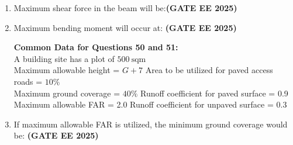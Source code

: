 \documentclass[journal,12pt,onecolumn]{IEEEtran}
\theoremstyle{remark}
\begin{document}
{\begin{enumerate}
\textbf{Common Data for Questions 48 and 49:} 
A beam of span $L$ is simply supported at two ends. One half span of the beam weighs $W$ and the remaining half span weighs $2W$.

\item Maximum shear force in the beam will be:\hfill \textbf{(GATE EE 2025)}
\begin{enumerate}
\end{enumerate}

\item Maximum bending moment will occur at: \hfill \textbf{(GATE EE 2025)}
\begin{enumerate}
\end{enumerate}

\textbf{Common Data for Questions 50 and 51:}
\\
A building site has a plot of $500 \ \text{sqm}$ 
\\
    
Maximum allowable height = $G+7$ \quad Area to be utilized for paved access roads = $10\%$ \\ 
Maximum ground coverage = $40\%$ \quad Runoff coefficient for paved surface = 0.9\\
Maximum allowable FAR = 2.0 \quad \quad Runoff coefficient for unpaved surface = 0.3\\


\item If maximum allowable FAR is utilized, the minimum ground coverage would be: \hfill \textbf{(GATE EE 2025)}
\begin{enumerate}
\end{enumerate}


\end{enumerate}}
\end{document}

